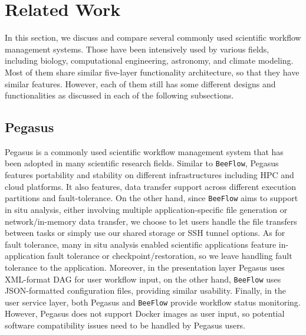 \section{Related Work}

In this section, we discuss and compare several commonly used scientific workflow management systems. Those have been intensively used by various fields, including biology, computational engineering, astronomy, and climate modeling. Most of them share similar five-layer functionality architecture, so that they have similar features. However, each of them still has some different designs and functionalities as discussed in each of the following subsections.

\subsection{Pegasus}
Pegasus \cite{deelman2005pegasus} is a commonly used scientific workflow management system that has been adopted in many scientific research fields. Similar to \texttt{BeeFlow}, Pegasus features portability and stability on different infrastructures including HPC and cloud platforms. It also features, data transfer support across different execution partitions and fault-tolerance. On the other hand, since \texttt{BeeFlow} aims to support in situ analysis, either involving multiple application-specific file generation or network/in-memory data transfer, we choose to let users handle the file transfers between tasks or simply use our shared storage or SSH tunnel options. As for fault tolerance, many in situ analysis enabled scientific applications feature in-application fault tolerance or checkpoint/restoration, so we leave handling fault tolerance to the application. Moreover, in the presentation layer Pegasus uses XML-format DAG for user workflow input, on the other hand, \texttt{BeeFlow} uses JSON-formatted configuration files, providing similar usability. Finally, in the user service layer, both Pegasus and \texttt{BeeFlow} provide workflow status monitoring. However, Pegasus does not support Docker images as user input, so potential software compatibility issues need to be handled by Pegasus users.


